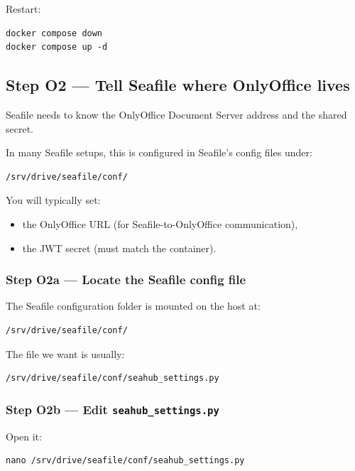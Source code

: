 Restart:

\begin{lstlisting}
docker compose down
docker compose up -d
\end{lstlisting}

\subsection{Step O2 --- Tell Seafile where OnlyOffice lives}
Seafile needs to know the OnlyOffice Document Server address and the shared secret.

In many Seafile setups, this is configured in Seafile's config files under:
\begin{lstlisting}
/srv/drive/seafile/conf/
\end{lstlisting}

You will typically set:
\begin{itemize}[leftmargin=*]
  \item the OnlyOffice URL (for Seafile-to-OnlyOffice communication),
  \item the JWT secret (must match the container).
\end{itemize}


\subsubsection*{Step O2a --- Locate the Seafile config file}
The Seafile configuration folder is mounted on the host at:
\begin{lstlisting}
/srv/drive/seafile/conf/
\end{lstlisting}

The file we want is usually:
\begin{lstlisting}
/srv/drive/seafile/conf/seahub_settings.py
\end{lstlisting}

\subsubsection*{Step O2b --- Edit \texttt{seahub\_settings.py}}
Open it:
\begin{lstlisting}
nano /srv/drive/seafile/conf/seahub_settings.py
\end{lstlisting}

